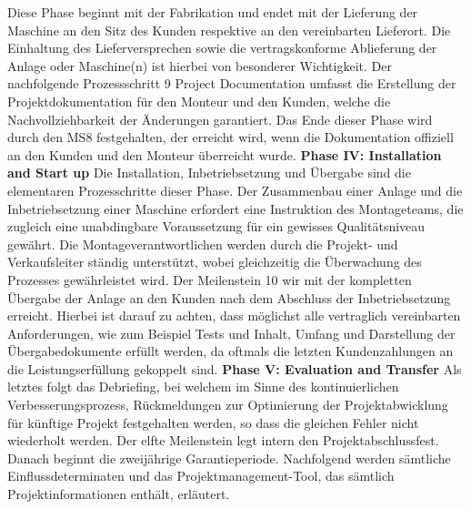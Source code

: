 \newline
Diese Phase beginnt mit der Fabrikation und endet mit der Lieferung der Maschine an den Sitz des Kunden respektive an den vereinbarten Lieferort. Die Einhaltung des Lieferversprechen sowie die vertragskonforme Ablieferung der Anlage oder Maschine(n) ist hierbei von besonderer Wichtigkeit. Der nachfolgende Prozessschritt 9 Project Documentation umfasst die Erstellung der Projektdokumentation für den Monteur und den Kunden, welche die Nachvollziehbarkeit der Änderungen garantiert. Das Ende dieser Phase wird durch den MS8 festgehalten, der erreicht wird, wenn die Dokumentation offiziell an den Kunden und den Monteur überreicht wurde. 
\newline
\textbf{Phase IV: Installation and Start up}
\newline
Die Installation, Inbetriebsetzung und Übergabe sind die elementaren Prozesschritte dieser Phase. Der Zusammenbau einer Anlage und die Inbetriebsetzung einer Maschine erfordert eine Instruktion des Montageteams, die zugleich eine unabdingbare Voraussetzung für ein gewisses Qualitätsniveau gewährt. Die Montageverantwortlichen werden durch die Projekt- und Verkaufsleiter ständig unterstützt, wobei gleichzeitig die Überwachung des Prozesses gewährleistet wird. Der Meilenstein 10 wir mit der kompletten Übergabe der Anlage an den Kunden nach dem Abschluss der Inbetriebsetzung erreicht. Hierbei ist darauf zu achten, dass möglichst alle vertraglich vereinbarten Anforderungen, wie zum Beispiel Tests und Inhalt, Umfang und Darstellung der Übergabedokumente erfüllt werden, da oftmals die letzten Kundenzahlungen an die Leistungserfüllung gekoppelt sind. 
\newline
\textbf{Phase V: Evaluation and Transfer}
\newline
Als letztes folgt das Debriefing, bei welchem im Sinne des kontinuierlichen Verbesserungsprozess, Rückmeldungen zur Optimierung der Projektabwicklung für künftige Projekt festgehalten werden, so dass die gleichen Fehler nicht wiederholt  werden. Der elfte Meilenstein legt intern den Projektabschlussfest. Danach beginnt die zweijährige Garantieperiode. 
Nachfolgend werden sämtliche Einflussdeterminaten und das Projektmanagement-Tool, das sämtlich Projektinformationen enthält, erläutert.
\newline
